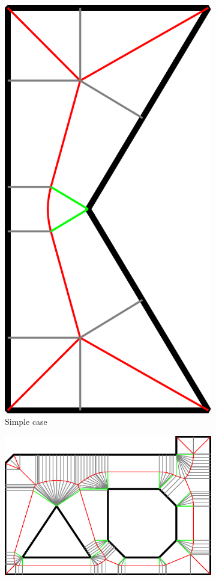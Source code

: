 \begin{figure}
\begin{subfigure}{0.3\columnwidth}
\centering
\includegraphics[height=1.5\columnwidth]{sources/method/MAT_explanation_shape_decomposition.pdf}
\caption{Simple case}
\label{shape_decomposition_simple}
\end{subfigure}
\begin{subfigure}{0.65\columnwidth}
\includegraphics[width=\columnwidth]{sources/method/MAT_VD_VQ.pdf}

\end{subfigure}
\end{figure}
